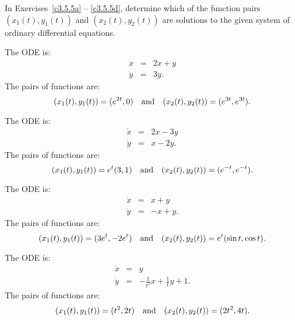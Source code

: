\documentclass{ximera}
\begin{document}
\noindent In Exercises~\ref{c3.5.5a} -- \ref{c3.5.5d}, determine which of
the function pairs $(x_1(t),y_1(t))$ and $(x_2(t),y_2(t))$ are solutions
to the given system of ordinary differential equations.
\begin{exercise} \label{c3.5.5a}
The ODE is:
\begin{eqnarray*}
\dot{x} & = & 2x+y  \\
\dot{y} & = & 3y.
\end{eqnarray*}
The pairs of functions are:
\[
(x_1(t),y_1(t)) = (e^{2t},0)  \quad\mbox{and}\quad (x_2(t),y_2(t)) = (e^{3t},e^{3t}).
\]
\end{exercise}
\begin{exercise} \label{c3.5.5b}
The ODE is:
\begin{eqnarray*}
\dot{x} & = & 2x - 3y  \\
\dot{y} & = & x - 2y.
\end{eqnarray*}
The pairs of functions are:
\[
(x_1(t),y_1(t)) = e^t(3,1)  \quad\mbox{and}\quad (x_2(t),y_2(t)) = (e^{-t},e^{-t}).
\]
\end{exercise}
\begin{exercise} \label{c3.5.5c}
The ODE is:
\begin{eqnarray*}
\dot{x} & = &  x + y \\
\dot{y} & = & -x + y.
\end{eqnarray*}
The pairs of functions are:
\[
(x_1(t),y_1(t)) =  (3e^t, -2e^t) \quad\mbox{and}\quad (x_2(t),y_2(t)) = e^t(\sin t,\cos t).
\]
\end{exercise}
\begin{exercise} \label{c3.5.5d}
The ODE is:
\begin{eqnarray*}
\dot{x} & = & y  \\
\dot{y} & = &  -\frac{1}{t^2}x + \frac{1}{t}y + 1.
\end{eqnarray*}
The pairs of functions are:
\[
(x_1(t),y_1(t)) = (t^2,2t)  \quad\mbox{and}\quad (x_2(t),y_2(t)) = (2t^2,4t).
\]
\end{exercise}
\end{document}
